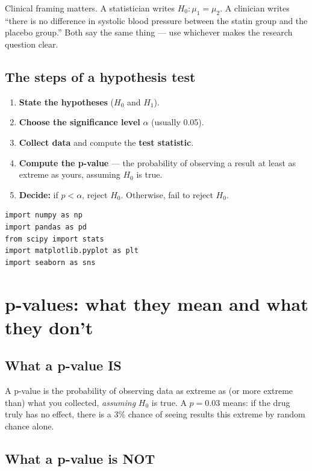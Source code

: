 \begin{clinicalnote}
Clinical framing matters. A statistician writes $H_0: \mu_1 = \mu_2$. A clinician writes ``there is no difference in systolic blood pressure between the statin group and the placebo group.'' Both say the same thing --- use whichever makes the research question clear.
\end{clinicalnote}

\subsection{The steps of a hypothesis test}

\begin{enumerate}
  \item \textbf{State the hypotheses} ($H_0$ and $H_1$).
  \item \textbf{Choose the significance level} $\alpha$ (usually 0.05).
  \item \textbf{Collect data} and compute the \textbf{test statistic}.
  \item \textbf{Compute the p-value} --- the probability of observing a result at least as extreme as yours, assuming $H_0$ is true.
  \item \textbf{Decide:} if $p < \alpha$, reject $H_0$. Otherwise, fail to reject $H_0$.
\end{enumerate}

\begin{verbatim}
import numpy as np
import pandas as pd
from scipy import stats
import matplotlib.pyplot as plt
import seaborn as sns
\end{verbatim}

\section{p-values: what they mean and what they don't}

\subsection{What a p-value IS}

A p-value is the probability of observing data as extreme as (or more extreme than) what you collected, \emph{assuming} $H_0$ is true. A $p = 0.03$ means: if the drug truly has no effect, there is a 3\% chance of seeing results this extreme by random chance alone.

\subsection{What a p-value is NOT}

